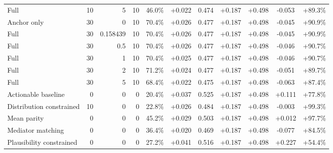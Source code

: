 \begin{table}[htbp]
\begin{tabular}{lrrrccccccc}
Full & 10 & 5 & 10 & 46.0\% & +0.022 & 0.474 & +0.187 & +0.498 & -0.053 & +89.3\% \\
Anchor only & 30 & 0 & 10 & 70.4\% & +0.026 & 0.477 & +0.187 & +0.498 & -0.045 & +90.9\% \\
Full & 30 & 0.158439 & 10 & 70.4\% & +0.026 & 0.477 & +0.187 & +0.498 & -0.045 & +90.9\% \\
Full & 30 & 0.5 & 10 & 70.4\% & +0.026 & 0.477 & +0.187 & +0.498 & -0.046 & +90.7\% \\
Full & 30 & 1 & 10 & 70.4\% & +0.025 & 0.477 & +0.187 & +0.498 & -0.046 & +90.7\% \\
Full & 30 & 2 & 10 & 71.2\% & +0.024 & 0.477 & +0.187 & +0.498 & -0.051 & +89.7\% \\
Full & 30 & 5 & 10 & 68.4\% & +0.022 & 0.475 & +0.187 & +0.498 & -0.063 & +87.4\% \\
Actionable baseline & 0 & 0 & 0 & 20.4\% & +0.037 & 0.525 & +0.187 & +0.498 & +0.111 & +77.8\% \\
Distribution constrained & 10 & 0 & 0 & 22.8\% & +0.026 & 0.484 & +0.187 & +0.498 & -0.003 & +99.3\% \\
Mean parity & 0 & 0 & 0 & 45.2\% & +0.029 & 0.503 & +0.187 & +0.498 & +0.012 & +97.7\% \\
Mediator matching & 0 & 0 & 0 & 36.4\% & +0.020 & 0.469 & +0.187 & +0.498 & -0.077 & +84.5\% \\
Plausibility constrained & 0 & 0 & 0 & 27.2\% & +0.041 & 0.516 & +0.187 & +0.498 & +0.227 & +54.4\% \\
\bottomrule
\end{tabular}
\end{table}